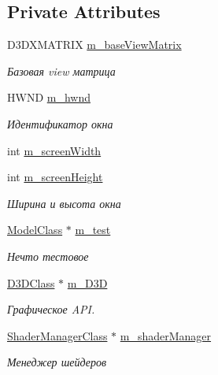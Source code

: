 \subsection*{Private Attributes}
\begin{DoxyCompactItemize}
\item 
D3\+D\+X\+M\+A\+T\+R\+IX \hyperlink{class_graphics_class_ac12353f01cd55981f3aa83d4ce35ead2}{m\+\_\+base\+View\+Matrix}
\begin{DoxyCompactList}\small\item\em Базовая view матрица \end{DoxyCompactList}\item 
H\+W\+ND \hyperlink{class_graphics_class_a55dee7ff9af99491b90062eec49c921d}{m\+\_\+hwnd}
\begin{DoxyCompactList}\small\item\em Идентификатор окна \end{DoxyCompactList}\item 
int \hyperlink{class_graphics_class_a3ecaa80e3d6f439a318c01d845cb5fd2}{m\+\_\+screen\+Width}
\item 
int \hyperlink{class_graphics_class_a14dbff7ec495e521402dc93df9adefad}{m\+\_\+screen\+Height}
\begin{DoxyCompactList}\small\item\em Ширина и высота окна \end{DoxyCompactList}\item 
\hyperlink{class_model_class}{Model\+Class} $\ast$ \hyperlink{class_graphics_class_aa63d5284daefe96b58c9d45e02b51e2d}{m\+\_\+test}
\begin{DoxyCompactList}\small\item\em Нечто тестовое \end{DoxyCompactList}\item 
\hyperlink{class_d3_d_class}{D3\+D\+Class} $\ast$ \hyperlink{class_graphics_class_a90278dfe587aad87cee2a2a6daf3bc9c}{m\+\_\+\+D3D}
\begin{DoxyCompactList}\small\item\em Графическое A\+PI. \end{DoxyCompactList}\item 
\hyperlink{class_shader_manager_class}{Shader\+Manager\+Class} $\ast$ \hyperlink{class_graphics_class_afb1a67e5d50ef3545cc2c386ce3d683e}{m\+\_\+shader\+Manager}
\begin{DoxyCompactList}\small\item\em Менеджер шейдеров \end{DoxyCompactList}\item 

\end{DoxyCompactItemize}

